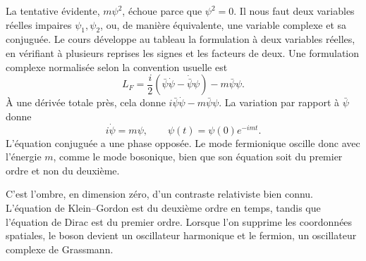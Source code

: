 La tentative évidente, \(m\psi^2\), échoue parce que \(\psi^2=0\). Il nous faut deux variables réelles impaires \(\psi_1,\psi_2\), ou, de manière équivalente, une variable complexe et sa conjuguée. Le cours développe au tableau la formulation à deux variables réelles, en vérifiant à plusieurs reprises les signes et les facteurs de deux. Une formulation complexe normalisée selon la convention usuelle est
\begin{equation}
L_F=\frac{i}{2}
\left(\bar\psi\dot\psi-\dot{\bar\psi}\psi\right)
-m\bar\psi\psi.
\label{eq:l7-fermion-lagrangian}
\end{equation}
À une dérivée totale près, cela donne \(i\bar\psi\dot\psi-m\bar\psi\psi\). La variation par rapport à \(\bar\psi\) donne
\begin{equation}
i\dot\psi=m\psi,
\qquad
\psi(t)=\psi(0)e^{-imt}.
\label{eq:l7-fermion-eom}
\end{equation}
L’équation conjuguée a une phase opposée. Le mode fermionique oscille donc avec l’énergie \(m\), comme le mode bosonique, bien que son équation soit du premier ordre et non du deuxième.


C’est l’ombre, en dimension zéro, d’un contraste relativiste bien connu. L’équation de Klein--Gordon est du deuxième ordre en temps, tandis que l’équation de Dirac est du premier ordre. Lorsque l’on supprime les coordonnées spatiales, le boson devient un oscillateur harmonique et le fermion, un oscillateur complexe de Grassmann.

\begin{classroomqa}
\end{classroomqa}

